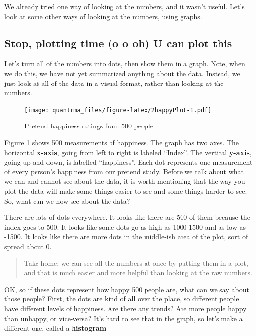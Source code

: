 \documentclass[
]{book}
\begin{document}
We already tried one way of looking at the numbers, and it wasn't useful. Let's look at some other ways of looking at the numbers, using graphs.

\hypertarget{stop-plotting-time-o-o-oh-u-can-plot-this}{%
\subsection{Stop, plotting time (o o oh) U can plot this}\label{stop-plotting-time-o-o-oh-u-can-plot-this}}

Let's turn all of the numbers into dots, then show them in a graph. Note, when we do this, we have not yet summarized anything about the data. Instead, we just look at all of the data in a visual format, rather than looking at the numbers.

\begin{figure}
\centering
\texttt{[image: quantrma\_files/figure-latex/2happyPlot-1.pdf]}
\caption{\label{fig:2happyPlot}Pretend happiness ratings from 500 people}
\end{figure}

Figure \ref{fig:2happyPlot} shows 500 measurements of happiness. The graph has two axes. The horizontal \textbf{x-axis}, going from left to right is labeled ``Index''. The vertical \textbf{y-axis}, going up and down, is labelled ``happiness''. Each dot represents one measurement of every person's happiness from our pretend study. Before we talk about what we can and cannot see about the data, it is worth mentioning that the way you plot the data will make some things easier to see and some things harder to see. So, what can we now see about the data?

There are lots of dots everywhere. It looks like there are 500 of them because the index goes to 500. It looks like some dots go as high as 1000-1500 and as low as -1500. It looks like there are more dots in the middle-ish area of the plot, sort of spread about 0.

\begin{quote}
Take home: we can see all the numbers at once by putting them in a plot, and that is much easier and more helpful than looking at the raw numbers.
\end{quote}

OK, so if these dots represent how happy 500 people are, what can we say about those people? First, the dots are kind of all over the place, so different people have different levels of happiness. Are there any trends? Are more people happy than unhappy, or vice-versa? It's hard to see that in the graph, so let's make a different one, called a \textbf{histogram}
\end{document}
